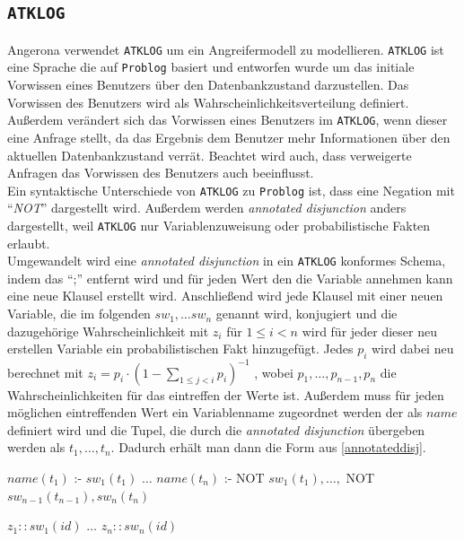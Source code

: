 \documentclass[german,version-2020-11]{uzl-thesis}
\begin{document}
\subsection{\texttt{ATKLOG}}
Angerona verwendet \texttt{ATKLOG} um ein Angreifermodell zu modellieren. \texttt{ATKLOG} ist eine Sprache die auf \texttt{Problog} basiert und entworfen wurde um das initiale Vorwissen eines Benutzers über den Datenbankzustand darzustellen. Das Vorwissen des Benutzers wird als Wahrscheinlichkeitsverteilung definiert. Außerdem verändert sich das Vorwissen eines Benutzers im \texttt{ATKLOG}, wenn dieser eine Anfrage stellt, da das Ergebnis dem Benutzer mehr Informationen über den aktuellen Datenbankzustand verrät. Beachtet wird auch, dass verweigerte Anfragen das Vorwissen des Benutzers auch beeinflusst.\cite{guarnieri2017securing} \\ 
Ein syntaktische Unterschiede von \texttt{ATKLOG} zu \texttt{Problog} ist, dass eine Negation mit \enquote{\textit{NOT}} dargestellt wird. Außerdem werden \textit{annotated disjunction} anders dargestellt, weil \texttt{ATKLOG} nur Variablenzuweisung oder probabilistische Fakten erlaubt. \\ Umgewandelt wird eine \textit{annotated disjunction} in ein \texttt{ATKLOG} konformes Schema, indem das \enquote{;} entfernt wird und für jeden Wert den die Variable annehmen kann eine neue Klausel erstellt wird. Anschließend wird jede Klausel mit einer neuen Variable, die im folgenden $sw_1, \dots sw_n$ genannt wird, konjugiert und die dazugehörige Wahrscheinlichkeit mit $z_i$ für $1 \leq i < n$ wird für jeder dieser neu erstellen Variable ein probabilistischen Fakt hinzugefügt. Jedes $p_i$ wird dabei neu berechnet mit $z_i = p_i \cdot (1 - \sum_{1\leq j<i}p_i)^{-1}$ , wobei $p_1, \dots ,p_{n-1}, p_n$ die Wahrscheinlichkeiten für das eintreffen der Werte ist.
Außerdem muss für jeden möglichen eintreffenden Wert ein Variablenname zugeordnet werden der als $name$ definiert wird und die Tupel, die durch die \textit{annotated disjunction} übergeben werden als $t_1 , \dots , t_n$. Dadurch erhält man dann die Form aus \autoref{annotateddisj}.
\begin{Pseudocode}[caption={Vorgehensweise bei \textit{annotated disjunction}}, label={annotateddisj}, numbers=left]
$name(t_1)$ :- $sw_1(t_1)$
$\dots$
$name(t_n)$ :- NOT $sw_1(t_1), \dots ,$ NOT $sw_{n−1}(t_{n−1}), sw_n(t_n)$
	
$z_1::sw_1(id)$
$\dots$
$z_n::sw_n(id)$
\end{Pseudocode} 
\end{document}
